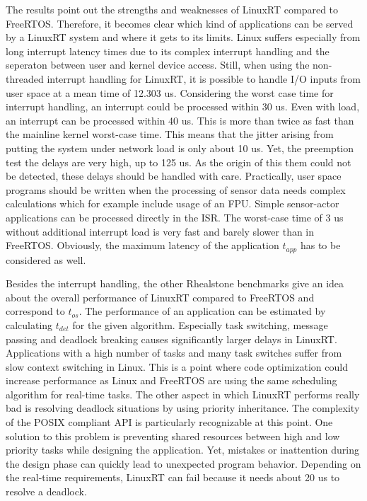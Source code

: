 The results point out the strengths and weaknesses of LinuxRT compared to FreeRTOS.
Therefore, it becomes clear which kind of applications can be served by a LinuxRT system and where it gets to its limits.
Linux suffers especially from long interrupt latency times due to its complex interrupt handling and the seperaton between user and kernel device access.
Still, when using the non-threaded interrupt handling for LinuxRT, it is possible to handle \ac{I/O} inputs from user space at a mean time of 12.303 us. Considering the worst case time for interrupt handling, an interrupt could be processed within 30 us.
Even with load, an interrupt can be processed within 40 us. 
This is more than twice as fast than the mainline kernel worst-case time.
This means that the jitter arising from putting the system under network load is only about 10 us.
Yet, the preemption test the delays are very high, up to 125 us.
As the origin of this them could not be detected, these delays should be handled with care.
Practically, user space programs should be written when the processing of sensor data needs complex calculations which for example include usage of an \ac{FPU}.
Simple sensor-actor applications can be processed directly in the \ac{ISR}.
The worst-case time of 3 us without additional interrupt load is very fast and barely slower than in FreeRTOS. 
Obviously, the maximum latency of the application $t_{app}$ has to be considered as well.
\par
Besides the interrupt handling, the other Rhealstone benchmarks give an idea about the overall performance of LinuxRT compared to FreeRTOS and correspond to $t_{os}$. 
The performance of an application can be estimated by calculating $t_{det}$ for the given algorithm.
Especially task switching, message passing and deadlock breaking causes significantly larger delays in LinuxRT.
Applications with a high number of tasks and many task switches suffer from slow context switching in Linux. 
This is a point where code optimization could increase performance as Linux and FreeRTOS are using the same scheduling algorithm for real-time tasks.  
The other aspect in which LinuxRT performs really bad is resolving deadlock situations by using priority inheritance.
The complexity of the POSIX compliant \ac{API} is particularly recognizable at this point.
One solution to this problem is preventing shared resources between high and low priority tasks while designing the application. 
Yet, mistakes or inattention during the design phase can quickly lead to unexpected program behavior.
Depending on the real-time requirements, LinuxRT can fail because it needs about 20 us to resolve a deadlock. 
